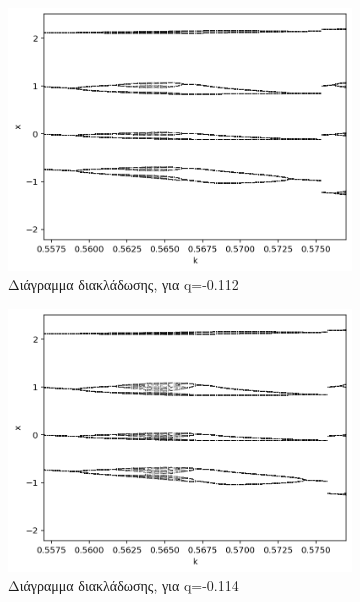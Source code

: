 \begin{figure}[h!]
	\centering
	\caption{}
	\label{f:g2}
	\begin{subfigure}[b]{0.4\textwidth}
		\centering
		\includegraphics[width=\textwidth]{LateX images/graphs/g2}
		\caption{Διάγραμμα διακλάδωσης, για q=-0.112}
		\label{f:g3}
	\end{subfigure}
	\hfill
	\begin{subfigure}[b]{0.4\textwidth}
		\centering
		\includegraphics[width=\textwidth]{LateX images/graphs/g3}
		\caption{Διάγραμμα διακλάδωσης, για q=-0.114}
		\label{f:g4}
	\end{subfigure}
	\hfill
	\begin{subfigure}[b]{0.4\textwidth}

\end{subfigure}
\end{figure}
